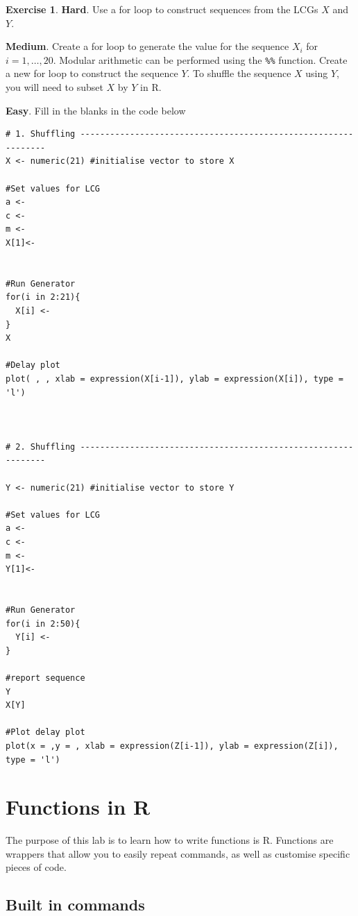 \documentclass[
]{book}
\theoremstyle{definition}
\theoremstyle{definition}
\theoremstyle{definition}
\newtheorem{exercise}{Exercise}[chapter]
\theoremstyle{definition}
\theoremstyle{remark}
\begin{document}
\begin{exercise}
\textbf{Hard}. Use a for loop to construct sequences from the LCGs \(X\) and \(Y\).

\textbf{Medium}. Create a for loop to generate the value for the sequence \(X_i\) for \(i = 1, \ldots, 20\). Modular arithmetic can be performed using the \texttt{\%\%} function. Create a new for loop to construct the sequence \(Y\). To shuffle the sequence \(X\) using \(Y\), you will need to subset \(X\) by \(Y\) in R.

\textbf{Easy}. Fill in the blanks in the code below

\begin{verbatim}
# 1. Shuffling ---------------------------------------------------------------
X <- numeric(21) #initialise vector to store X

#Set values for LCG
a <- 
c <- 
m <- 
X[1]<- 


#Run Generator
for(i in 2:21){
  X[i] <-
}
X

#Delay plot
plot( , , xlab = expression(X[i-1]), ylab = expression(X[i]), type = 'l')



# 2. Shuffling ---------------------------------------------------------------

Y <- numeric(21) #initialise vector to store Y

#Set values for LCG
a <- 
c <- 
m <- 
Y[1]<- 


#Run Generator
for(i in 2:50){
  Y[i] <- 
}

#report sequence
Y
X[Y]

#Plot delay plot
plot(x = ,y = , xlab = expression(Z[i-1]), ylab = expression(Z[i]), type = 'l')
\end{verbatim}

\end{exercise}

\hypertarget{functions-in-r}{%
\section{Functions in R}\label{functions-in-r}}

The purpose of this lab is to learn how to write functions is R. Functions are wrappers that allow you to easily repeat commands, as well as customise specific pieces of code.

\hypertarget{built-in-commands}{%
\subsection{Built in commands}\label{built-in-commands}}
\end{document}

